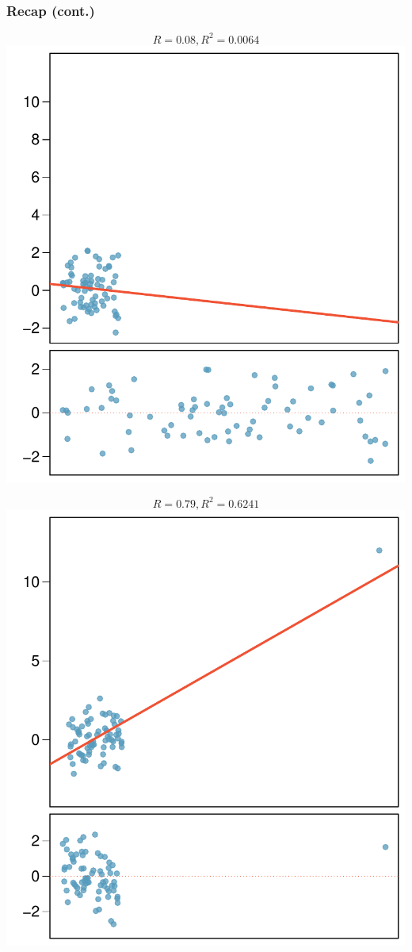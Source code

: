 
\begin{frame}
\frametitle{Recap (cont.)}

\vspace{-1cm}

{
\begin{center}
\[ R = 0.08, R^2 = 0.0064 \]
\includegraphics[width=\textwidth]{8-3_outliers/figures/outlierPlots/out5-1}
\end{center}
}
{
\begin{center}
\[ R = 0.79, R^2 = 0.6241 \]
\includegraphics[width=\textwidth]{8-3_outliers/figures/outlierPlots/out5}

\end{center}}
\end{frame}

